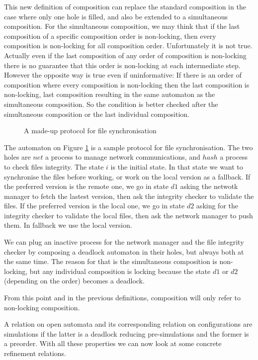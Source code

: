 \documentclass{article}
\begin{document}
This new definition of composition can replace the standard composition in the case where only one hole is filled, and also be extended to a simultaneous composition.
For the simultaneous composition, we may think that if the last composition of a specific composition order is non-locking, then every composition is non-locking for all composition order. %
Unfortunately it is not true.
Actually even if the last composition of any order of composition is non-locking there is no guarantee that this order is non-locking at each intermediate step.
However the opposite way is true even if uninformative:
If there is an order of composition where every composition is non-locking then the last composition is non-locking, last composition resulting in the same automaton as the simultaneous composition.
So the condition is better checked after the simultaneous composition or the last individual composition.
\begin{exi}
\begin{figure}
\centering

\caption{A made-up protocol for file synchronisation}
\label{fig:pnls}
\end{figure}
The automaton on Figure \ref{fig:pnls} is a sample protocol for file synchronisation.
The two holes are \(net\) a process to manage network communications, and \(hash\) a process to check files integrity.
The state \(i\) is the initial state.
In that state we want to synchronise the files before working, or work on the local version as a fallback.
If the preferred version is the remote one, we go in state \(d1\) asking the netwotk manager to fetch the lastest version, then ask the integrity checker to validate the files.
If the preferred version is the local one, we go in state \(d2\) asking for the integrity checker to validate the local files, then ask the network manager to push them.
In fallback we use the local version.

We can plug an inactive process for the network manager and the file integrity checker by composing a deadlock automaton in their holes, but always both at the same time.
The reason for that is the simultaneous composition is non-locking, but any individual composition is locking because the state \(d1\) or \(d2\) (depending on the order) becomes a deadlock.
\end{exi}
From this point and in the previous definitions, composition will only refer to non-locking composition.

A relation on open automata and its corresponding relation on configurations are simulations if the latter is a deadlock reducing pre-simulations and the former is a preorder.
With all these properties we can now look at some concrete refinement relations.
\end{document}
